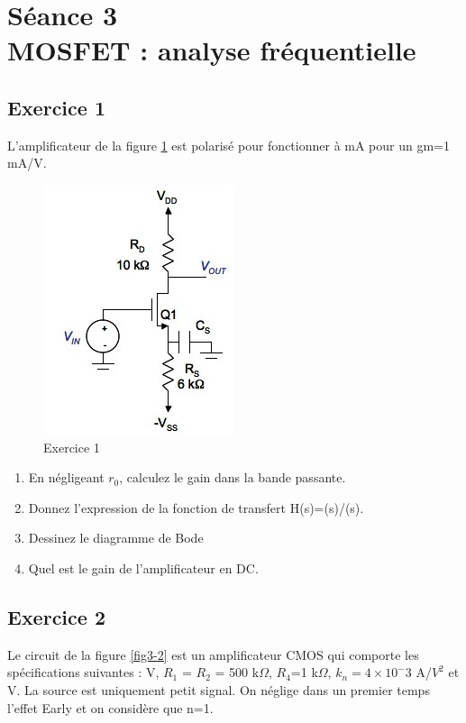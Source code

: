 \documentclass[paper=a4, fontsize=11pt]{article} %
\numberwithin{equation}{section} %
\numberwithin{figure}{section} %
\numberwithin{table}{section} %
\begin{document}
\newpage
\setcounter{figure}{0}
\setcounter{section}{3}
\section{Séance 3\\ MOSFET : analyse fréquentielle}
\subsection*{Exercice 1}
L'amplificateur de la figure \ref{fig3-1} est polarisé pour fonctionner à  mA pour un gm=1 mA/V.
\begin{figure}[!htbp]
   \centering
   \includegraphics[]{figure/fig3-1.png}
   \caption{Exercice 1}
   \label{fig3-1}
\end{figure}
\begin{enumerate}
	\item En négligeant $r_0$, calculez le gain dans la bande passante.
	\item Donnez l'expression de la fonction de transfert H(s)=\vout(s)/\vin(s).
	\item Dessinez le diagramme de Bode
	\item Quel est le gain de l'amplificateur en DC.
	
\end{enumerate}


\subsection*{Exercice 2}
Le circuit de la figure \ref{fig3-2} est un amplificateur CMOS qui comporte les spécifications suivantes :  V, $R_1$ = $R_2$ = 500 k$\Omega$, $R_4$=1 k$\Omega$, $k_n=4\times 10^-3$ A/$V^2$ et  V. La source \vin  est uniquement petit signal. On néglige dans un premier temps l'effet Early et on considère que n=1.
\end{document}
